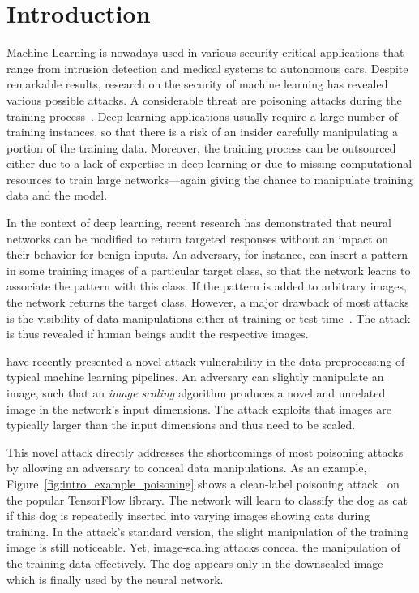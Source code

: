 \documentclass[conference]{IEEEtran}
\begin{document}
\section{Introduction}
Machine Learning is nowadays used in various security-critical 
applications that range from intrusion detection and medical 
systems to autonomous cars. Despite remarkable results, 
research on the security of machine learning has revealed various 
possible attacks.
A considerable threat are poisoning attacks during the training 
process~\citep[e.g.][]{BigNelLas11, GuDolGar17, LiuMaAaf+18}. 
Deep learning applications usually require a large number of 
training instances, so that there is a risk of an insider carefully 
manipulating a portion of the training data. Moreover, the training 
process can be outsourced either due to a lack of expertise in deep 
learning or due to missing computational resources to train large 
networks---again giving the chance to manipulate training data and the 
model.

In the context of deep learning, recent research has demonstrated that 
neural networks can be modified to return targeted responses without an 
impact on their behavior for benign inputs. An adversary, for instance, 
can insert a pattern in some training images of a particular 
target class, so that the network learns to associate the pattern with 
this class. If the pattern is added to arbitrary images, the network 
returns the target class.
However, a major drawback of most attacks is the visibility of data 
manipulations either at training or test time~\citep{GuDolGar17, 
LiuMaAaf+18}. The attack is thus revealed if human beings 
audit the respective images. 

\citet{XiaCheShe+19} have recently presented a novel attack 
vulnerability in the data preprocessing of typical machine learning 
pipelines. An adversary can slightly manipulate an image, such that an
\emph{image scaling} algorithm produces a novel and unrelated image in 
the network's input dimensions. The attack exploits that images are 
typically larger than the input dimensions and thus need to be scaled.

This novel attack directly addresses the shortcomings of 
most poisoning attacks by allowing an adversary to conceal data 
manipulations. As an example, Figure~\ref{fig:intro_example_poisoning} 
shows a clean-label poisoning attack~\citep{ShaHuaNaj+18} on the 
popular TensorFlow library. The network will learn to classify 
the dog as cat if this dog is repeatedly inserted into 
varying images showing cats during training.
In the attack's standard version, the slight manipulation of the 
training image is still noticeable. Yet, image-scaling attacks conceal 
the manipulation of the training data effectively. The dog appears only 
in the downscaled image which is finally used by the neural network.
\end{document}

